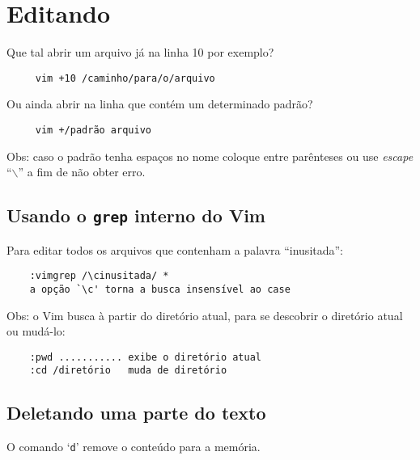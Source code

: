 
\chapter{Editando}
\label{Editando}

Que tal abrir um arquivo já na linha 10 por exemplo?

\begin{verbatim}
     vim +10 /caminho/para/o/arquivo
\end{verbatim}

Ou ainda abrir na linha que contém um determinado padrão?

\begin{verbatim}
     vim +/padrão arquivo
\end{verbatim}

Obs: caso o padrão tenha espaços no nome coloque entre parênteses ou
use {\em escape} ``$\backslash$'' a fim de não obter erro.

\section{Usando o {\tt grep} interno do Vim}
\label{sec:Usando o grep interno do Vim}

Para editar todos os arquivos que contenham a palavra ``inusitada'':

\begin{verbatim}
    :vimgrep /\cinusitada/ *
    a opção `\c' torna a busca insensível ao case
\end{verbatim}

Obs: o Vim busca à partir do diretório atual, para se descobrir 
o diretório atual ou mudá-lo:

\begin{verbatim}
    :pwd ........... exibe o diretório atual
    :cd /diretório   muda de diretório
\end{verbatim}

\section{Deletando uma parte do texto}\label{Deletando uma parte do texto}

O comando `{\tt d}' remove o conteúdo para a memória.

